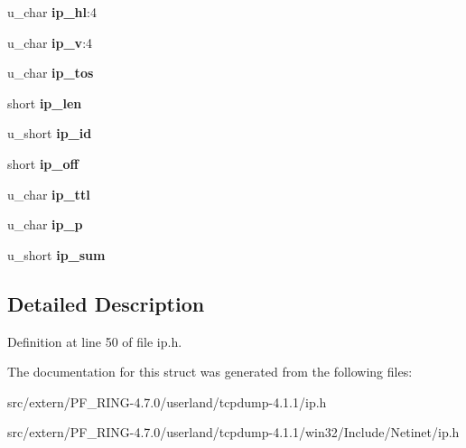\begin{DoxyCompactItemize}
\item 
\hypertarget{structip_a735917e7ba8e3512f790e748558ba0ae}{
u\_\-char {\bfseries ip\_\-hl}:4}
\label{structip_a735917e7ba8e3512f790e748558ba0ae}

\item 
\hypertarget{structip_ab74e6295152f54fb6789cf3e879e2e49}{
u\_\-char {\bfseries ip\_\-v}:4}
\label{structip_ab74e6295152f54fb6789cf3e879e2e49}

\item 
\hypertarget{structip_a6bb0ce0b741d5362c1ffb59de45c002f}{
u\_\-char {\bfseries ip\_\-tos}}
\label{structip_a6bb0ce0b741d5362c1ffb59de45c002f}

\item 
\hypertarget{structip_ae2c365b928679abbccd982e286acbf08}{
short {\bfseries ip\_\-len}}
\label{structip_ae2c365b928679abbccd982e286acbf08}

\item 
\hypertarget{structip_a39ffb0f3d854db34ce84722763494e3f}{
u\_\-short {\bfseries ip\_\-id}}
\label{structip_a39ffb0f3d854db34ce84722763494e3f}

\item 
\hypertarget{structip_a7eeb7cd0279b8a086d58d530d07807f3}{
short {\bfseries ip\_\-off}}
\label{structip_a7eeb7cd0279b8a086d58d530d07807f3}

\item 
\hypertarget{structip_af6da26caa84ccb1a03aaa1c4b908eb6c}{
u\_\-char {\bfseries ip\_\-ttl}}
\label{structip_af6da26caa84ccb1a03aaa1c4b908eb6c}

\item 
\hypertarget{structip_a13e417b652ed826ff0c5cbdcddbfbfa1}{
u\_\-char {\bfseries ip\_\-p}}
\label{structip_a13e417b652ed826ff0c5cbdcddbfbfa1}

\item 
\hypertarget{structip_a834452d6936e01a21447abeb037d87ba}{
u\_\-short {\bfseries ip\_\-sum}}
\label{structip_a834452d6936e01a21447abeb037d87ba}

\end{DoxyCompactItemize}


\subsection{Detailed Description}


Definition at line 50 of file ip.h.



The documentation for this struct was generated from the following files:\begin{DoxyCompactItemize}
\item 
src/extern/PF\_\-RING-\/4.7.0/userland/tcpdump-\/4.1.1/ip.h\item 
src/extern/PF\_\-RING-\/4.7.0/userland/tcpdump-\/4.1.1/win32/Include/Netinet/ip.h\end{DoxyCompactItemize}
